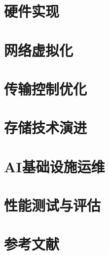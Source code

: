 \documentclass[12pt,a4paper]{book}
\begin{document}
\appendix
\chapter{硬件实现}


\chapter{网络虚拟化}


\chapter{传输控制优化}


\chapter{存储技术演进}


\chapter{AI基础设施运维}


\chapter{性能测试与评估}


\backmatter
\chapter*{参考文献}
\end{document}
